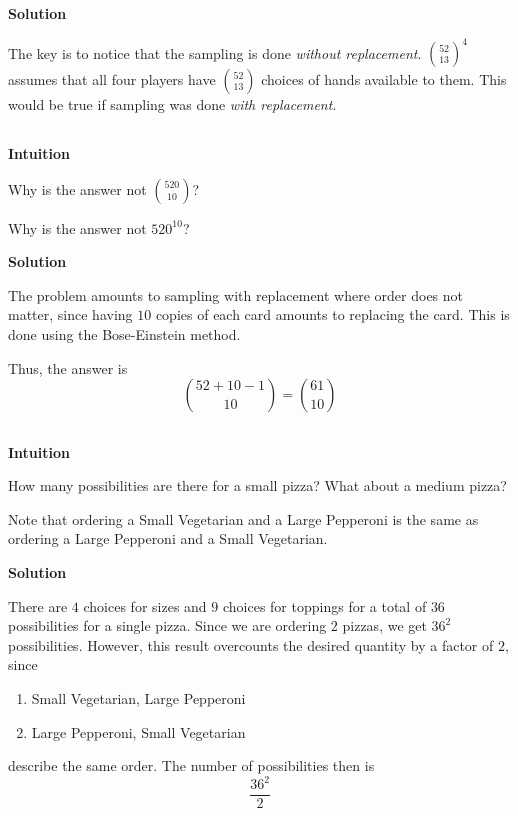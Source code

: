 \documentclass[]{book}
\providecommand{\tightlist}{%
  \setlength{\itemsep}{0pt}\setlength{\parskip}{0pt}}
\begin{document}
 \textbf{Solution}

The key is to notice that the sampling is done \emph{without
replacement}. \({52 \choose 13}^{4}\) assumes that all four players have
\({52 \choose 13}\) choices of hands available to them. This would be
true if sampling was done \emph{with replacement}.

\subsection{}\label{section-12}

\textbf{Intuition}

Why is the answer not \({520 \choose 10}\)?

Why is the answer not \(520^{10}\)?

 \textbf{Solution}

The problem amounts to sampling with replacement where order does not
matter, since having \(10\) copies of each card amounts to replacing the
card. This is done using the Bose-Einstein method.

Thus, the answer is \[{52 + 10 - 1 \choose 10} = {61 \choose 10}\]

\subsection{}\label{section-13}

\textbf{Intuition}

How many possibilities are there for a small pizza? What about a medium
pizza?

Note that ordering a Small Vegetarian and a Large Pepperoni is the same
as ordering a Large Pepperoni and a Small Vegetarian.

 \textbf{Solution}

There are \(4\) choices for sizes and \(9\) choices for toppings for a
total of \(36\) possibilities for a single pizza. Since we are ordering
\(2\) pizzas, we get \(36^{2}\) possibilities. However, this result
overcounts the desired quantity by a factor of \(2\), since

\begin{enumerate}
\def\labelenumi{\arabic{enumi}.}
\tightlist
\item
  Small Vegetarian, Large Pepperoni
\item
  Large Pepperoni, Small Vegetarian
\end{enumerate}

describe the same order. The number of possibilities then is
\[\frac{36^{2}}{2}\]


\end{document}

